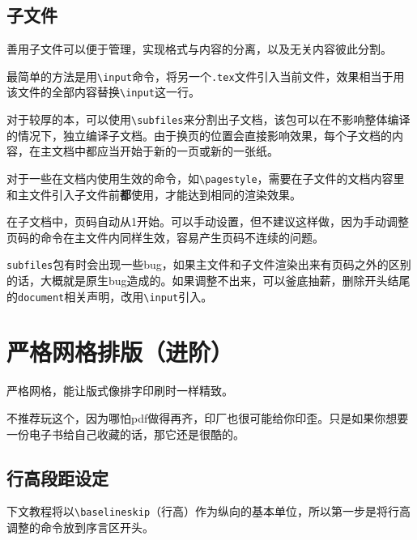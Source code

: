 \documentclass[10pt,openany]{book}
\begin{document}
\begin{sloppypar}
    \section{子文件}

    善用子文件可以便于管理，实现格式与内容的分离，以及无关内容彼此分割。

    最简单的方法是用\texttt{\textbackslash{}input}命令，将另一个\texttt{.tex}文件引入当前文件，效果相当于用该文件的全部内容替换\texttt{\textbackslash{}input}这一行。

    

    对于较厚的本，可以使用\texttt{\textbackslash{}subfiles}来分割出子文档，该包可以在不影响整体编译的情况下，独立编译子文档。由于换页的位置会直接影响效果，每个子文档的内容，在主文档中都应当开始于新的一页或新的一张纸。

    

    对于一些在文档内使用生效的命令，如\texttt{\textbackslash{}pagestyle}，需要在子文件的文档内容里和主文件引入子文件前\textbf{都}使用，才能达到相同的渲染效果。

    在子文档中，页码自动从1开始。可以手动设置，但不建议这样做，因为手动调整页码的命令在主文件内同样生效，容易产生页码不连续的问题。

    \texttt{subfiles}包有时会出现一些bug，如果主文件和子文件渲染出来有页码之外的区别的话，大概就是原生bug造成的。如果调整不出来，可以釜底抽薪，删除开头结尾的\texttt{document}相关声明，改用\texttt{\textbackslash{}input}引入。

    \chapter{严格网格排版（进阶）}

    严格网格，能让版式像排字印刷时一样精致。

    不推荐玩这个，因为哪怕pdf做得再齐，印厂也很可能给你印歪。只是如果你想要一份电子书给自己收藏的话，那它还是很酷的。

    \section{行高段距设定}

    下文教程将以\texttt{\textbackslash{}baselineskip}（行高）作为纵向的基本单位，所以第一步是将行高调整的命令放到序言区开头。

    


\end{sloppypar}
\end{document}
